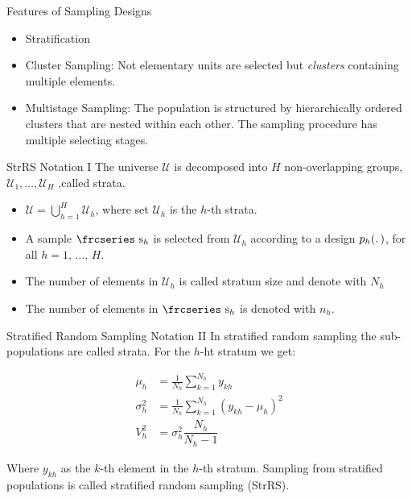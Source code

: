\documentclass[10pt]{beamer}\usepackage[]{graphicx}\usepackage[]{color}
\newcommand{\eqname}[1]{\tag*{#1}} %
\newcommand{\textfrc}[1]{{\frcseries#1}}
\newcommand{\mathfrc}[1]{\text{\textfrc{#1}}}
\begin{document}
\begin{frame}{Features of Sampling Designs}
\begin{itemize}
\item Stratification
\item Cluster Sampling: Not elementary units are selected but \emph{clusters} containing multiple elements. 
\item Multistage Sampling: The population is structured by hierarchically ordered clusters that are nested within each other. The sampling procedure has multiple selecting stages. 
\end{itemize}
\end{frame}


\begin{frame}{StrRS Notation I}
  The universe $\mathcal{U}$ is decomposed into $H$ non-overlapping groups,
  $\mathcal{U}_1,\dots,\mathcal{U}_H$ ,called strata.
  \begin{itemize}
  	\item $\mathcal{U} = \bigcup\limits_{h=1}^H \mathcal{U}_h$, where set $\mathcal{U}_h$ is
  the $h$-th
  strata. 
  	\item A sample $\mathfrc{s}_{h}$ is selected from $\mathcal{U}_h$ according to a design
  $p_h(\ldotp)$, for all $h=1,\,\ldots,\,H$. 
  	\item The number of elements in $\mathcal{U}_h$ is called stratum size and denote
  with $N_h$
  	\item The number of elements in $\mathfrc{s}_{h}$ is denoted with $n_h$.
  \end{itemize}
\end{frame}

\begin{frame}{Stratified Random Sampling Notation II}
  In stratified random sampling the sub-populations are called strata. For the  $h$-ht stratum
  we get:
  
  \begin{align}
  \mu_{h}      &= \frac{1}{N_h} \sum^{N_h}_{k=1} y_{kh} \eqname{mean of stratum h} \\
  \sigma^2_{h} &= \frac{1}{N_h}\sum^{N_h}_{k=1} (y_{kh}-\mu_{h})^2  \eqname{variance of stratum $h$} \\
  V^2_{h} & = \sigma^2_{h} \dfrac{N_h}{N_h-1} \nonumber
  \end{align}
  
  Where  $y_{kh}$ as the $k$-th element in the $h$-th stratum.
  Sampling from stratified populations is called stratified random sampling (StrRS).
  
\end{frame}
\end{document}
